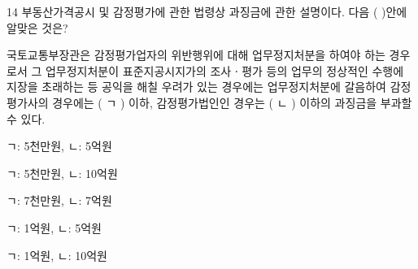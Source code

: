 \begin{question}{14}
부동산가격공시 및 감정평가에 관한 법령상 과징금에 관한 설명이다. 다음 ( )안에 알맞은 것은?
\begin{framedtext}
국토교통부장관은 감정평가업자의 위반행위에 대해 업무정지처분을 하여야 하는 경우로서 그 업무정지처분이 표준지공시지가의 조사ㆍ평가 등의 업무의 정상적인 수행에 지장을 초래하는 등 공익을 해칠 우려가 있는 경우에는 업무정지처분에 갈음하여 감정평가사의 경우에는 ( ㄱ ) 이하, 감정평가법인인 경우는 ( ㄴ ) 이하의 과징금을 부과할 수 있다. \par
\end{framedtext}
\begin{choices}
  \item ㄱ: 5천만원, ㄴ: 5억원
  \item ㄱ: 5천만원, ㄴ: 10억원
  \item ㄱ: 7천만원, ㄴ: 7억원
  \item ㄱ: 1억원, ㄴ: 5억원
  \item ㄱ: 1억원, ㄴ: 10억원
\end{choices}
\end{question}
